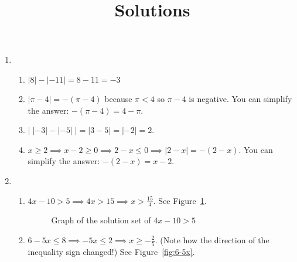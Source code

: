 \documentclass{article}
\title{\commonPSTitleZeroZeroA\ Solutions}
\author{\commonAuthor}
\date{\commonDateZeroZeroA}
\newcommand{\ds}{\displaystyle}
\begin{document}
\maketitle
\begin{enumerate}
\item %
  \begin{enumerate}
  \item $\ds |8|-|-11| = 8 - 11 = -3$
  \item $\ds |\pi-4| = -(\pi -4)$ because $\pi<4$ so $\pi-4$ is
    negative.  You can simplify the answer: $-(\pi-4) = 4-\pi$.
  \item $\ds \big| \; |-3|-|-5| \; \big| = \left| 3-5 \right| = |-2| = 2$.
  \item $\ds x\ge 2 \implies x-2\ge 0 \implies 2-x\le 0 \implies |2-x| =
    -(2-x)$.  You can simplify the answer: $\ds -(2-x) = x-2$.
  \end{enumerate}
\item %
  \begin{enumerate}
  \item $4x-10>5 \implies 4x>15 \implies x>\frac{15}{4}$.  See
    Figure~\ref{fig:4x-10}. 
    \begin{figure}[htbp]
      \centering
      \caption{Graph of the solution set of $4x-10>5$}
      \label{fig:4x-10}
    \end{figure}
  \item $6-5x\le 8 \implies -5x \le 2 \implies x \ge -\frac{2}{5}$.
    (Note how the direction of the inequality sign changed!) See
    Figure~\ref{fig:6-5x}.
    \begin{figure}[htbp]

\end{figure}
\end{enumerate}
\end{enumerate}
\end{document}
